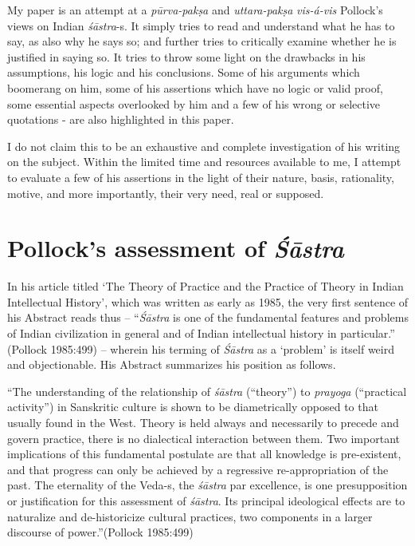 My paper is an attempt at a {\sl pūrva-pakṣa} and {\sl uttara-pakṣa} {\em vis-á-vis} Pollock's views on Indian {\sl śāstra}-s. It simply tries to read and understand what he has to say, as also why he says so; and further tries to critically examine whether he is justified in saying so. It tries to throw some light on the drawbacks in his assumptions, his logic and his conclusions. Some of his arguments which boomerang on him, some of his assertions which have no logic or valid proof, some essential aspects overlooked by him and a few of his wrong or selective quotations - are also highlighted in this paper. 

I do not claim this to be an exhaustive and complete investigation of his writing on the subject. Within the limited time and resources available to me, I attempt to evaluate a few of his assertions in the light of their nature, basis, rationality, motive, and more importantly, their very need, real or supposed.

\section*{Pollock's assessment of {\sl\bfseries Śāstra}}

In his article titled `The Theory of Practice and the Practice of Theory in Indian Intellectual History', which was written as early as 1985, the very first sentence of his Abstract reads thus -- ``{\it Śāstra} is one of the fundamental features and problems of Indian civilization in general and of Indian intellectual history in particular.'' (Pollock 1985:499) -- wherein his terming of {\it Śāstra} as a `problem'  is itself weird and objectionable. His Abstract summarizes his position as follows.
\begin{myquote}
``The understanding of the relationship of {\sl śāstra} (``theory'') to {\sl prayoga}  (``practical activity'') in Sanskritic culture is shown to be diametrically opposed to that usually found in the West. Theory is held always and necessarily to precede and govern practice, there is no dialectical interaction between them. Two important implications of this fundamental postulate are that all knowledge is pre-existent, and that progress can only be achieved by a regressive re-appropriation of the past. The eternality of the Veda-s, the {\sl śāstra} par excellence, is one presupposition or justification for this assessment of {\sl śāstra}. Its principal ideological effects are to naturalize and de-historicize cultural practices, two components in a larger discourse of power.''\hfill (Pollock 1985:499)
\end{myquote}
 
